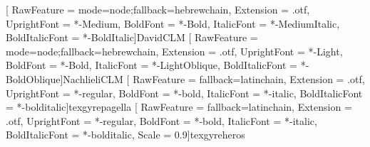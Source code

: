 [
  RawFeature = {mode=node;fallback=hebrewchain},
  Extension = .otf,
  UprightFont = *-Medium,
  BoldFont = *-Bold,
  ItalicFont = *-MediumItalic,
  BoldItalicFont = *-BoldItalic]{DavidCLM}
[
  RawFeature = {mode=node;fallback=hebrewchain},
  Extension = .otf,
  UprightFont = *-Light,
  BoldFont = *-Bold,
  ItalicFont = *-LightOblique,
  BoldItalicFont = *-BoldOblique]{NachlieliCLM}
[
  RawFeature = {fallback=latinchain},
  Extension = .otf,
  UprightFont = *-regular,
  BoldFont = *-bold,
  ItalicFont = *-italic,
  BoldItalicFont = *-bolditalic]{texgyrepagella}
[
  RawFeature = {fallback=latinchain},
  Extension = .otf,
  UprightFont = *-regular,
  BoldFont = *-bold,
  ItalicFont = *-italic,
  BoldItalicFont = *-bolditalic,
  Scale = 0.9]{texgyreheros}
\setmonofont[
  RawFeature = {fallback=monochain},
  Extension = .ttf,
  UprightFont = *,
  BoldFont = *-Bold,
  ItalicFont = *-Oblique,
  BoldItalicFont = *-BoldOblique,
  Scale = 0.82]{DejaVuSansMono}

